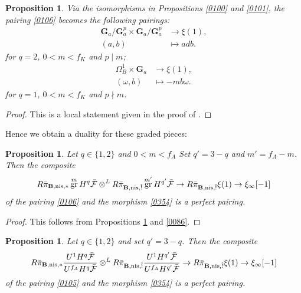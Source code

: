 \documentclass{amsart}
\newtheorem{Prop}[Thm]{Proposition}
\theoremstyle{remark}
\numberwithin{equation}{subsection}
\newcommand{\tensor}{\mathbin{\otimes}}
\newcommand{\Ga}{\mathbf{G}_{a}}
\newcommand{\alg}[1]{\mathbf{#1}}
\newcommand{\nis}{\mathrm{nis}}
\DeclareMathOperator{\gr}{gr}
\begin{document}
\begin{Prop} \label{0273}
	Via the isomorphisms in
	Propositions \ref{0100} and \ref{0101},
	the pairing \eqref{0106} becomes
	the following pairings:
		\begin{align*}
					\Ga / \Ga^{p} \times \Ga / \Ga^{p}
			&	\to
					\xi(1),
			\\
					(a, b)
			&	\mapsto
					a d b.
		\end{align*}
	for $q = 2$, $0 < m < f_{K}$ and $p \mid m$;
		\begin{align*}
					\Omega_{B}^{1} \times \Ga
			&	\to
					\xi(1),
			\\
					(\omega, b)
			&	\mapsto
					- m b \omega.
		\end{align*}
	for $q = 1$, $0 < m < f_{K}$ and $p \nmid m$.
\end{Prop}

\begin{proof}
	This is a local statement given in the proof of
	\cite[\S 6, (14)]{Kat79}.
\end{proof}

Hence we obtain a duality for these graded pieces:

\begin{Prop} \label{0274}
	Let $q \in \{1, 2\}$ and $0 < m < f_{A}$
	Set $q' = 3 - q$ and $m' = f_{A} - m$.
	Then the composite
		\[
					R \Bar{\pi}_{\alg{B}, \nis, \ast} \gr^{m} H^{q} \Bar{\mathcal{F}}
				\tensor^{L}
					R \Bar{\pi}_{\alg{B}, \nis, \Hat{!}} \gr^{m'} H^{q'} \Bar{\mathcal{F}}
			\to
				R \Bar{\pi}_{\alg{B}, \nis, \Hat{!}} \xi(1)
			\to
				\xi_{\infty}[-1]
		\]
	of the pairing \eqref{0106} and the morphism \eqref{0354} is a perfect pairing.
\end{Prop}

\begin{proof}
	This follows from Propositions \ref{0273} and \ref{0086}.
\end{proof}

\begin{Prop} \label{0275}
	Let $q \in \{1, 2\}$ and set $q' = 3 - q$.
	Then the composite
		\begin{equation} \label{0107}
					R \Bar{\pi}_{\alg{B}, \nis, \ast}
					\frac{
						U^{1} H^{q} \Bar{\mathcal{F}}
					}{
						U^{f_{A}} H^{q} \Bar{\mathcal{F}}
					}
				\tensor^{L}
					R \Bar{\pi}_{\alg{B}, \nis, \Hat{!}}
					\frac{
						U^{1} H^{q'} \Bar{\mathcal{F}}
					}{
						U^{f_{A}} H^{q'} \Bar{\mathcal{F}}
					}
			\to
				R \Bar{\pi}_{\alg{B}, \nis, \Hat{!}} \xi(1)
			\to
				\xi_{\infty}[-1]
		\end{equation}
	of the pairing \eqref{0105}
	and the morphism \eqref{0354} is a perfect pairing.
\end{Prop}
\end{document}
